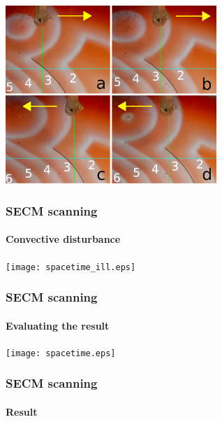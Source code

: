 \documentclass{beamer}
\begin{document}
\begin{frame}
	\centering
	\includegraphics[width=0.6\textwidth]{grabs.png}
	\frametitle{SECM scanning}
	\framesubtitle{Convective disturbance}
\end{frame}

\begin{frame}
	\centering
	\texttt{[image: spacetime\_ill.eps]}
	\frametitle{SECM scanning}
	\framesubtitle{Evaluating the result}
\end{frame}

\begin{frame}
	\centering
	\texttt{[image: spacetime.eps]}
	\frametitle{SECM scanning}
	\framesubtitle{Result}
\end{frame}
\end{document}
